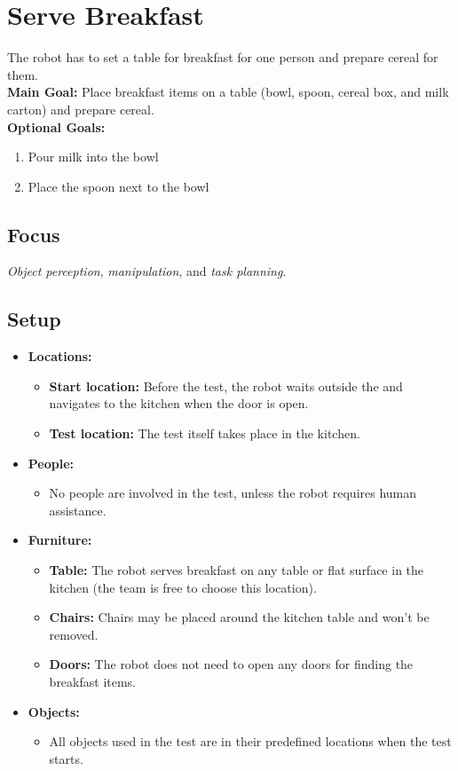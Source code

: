 \section{Serve Breakfast}
\label{test:serve-breakfast}
The robot has to set a table for breakfast for one person and prepare cereal for them.\\

\noindent \textbf{Main Goal:} Place breakfast items on a table (bowl, spoon, cereal box, and milk carton) and prepare cereal.\\

\noindent \textbf{Optional Goals:}
\begin{enumerate}[nosep]
	\item Pour milk into the bowl
	\item Place the spoon next to the bowl
\end{enumerate}

\subsection*{Focus}
\emph{Object perception}, \emph{manipulation}, and \emph{task planning}.

\subsection*{Setup}
\begin{itemize}[nosep]
	\item \textbf{Locations:}
		\begin{itemize}
			\item \textbf{Start location:} Before the test, the robot waits outside the \Arena{} and navigates to the kitchen when the door is open.
			\item \textbf{Test location:} The test itself takes place in the kitchen.
		\end{itemize}
		\item \textbf{People:}
			\begin{itemize}
				\item No people are involved in the test, unless the robot requires human assistance.
			\end{itemize}
	\item \textbf{Furniture:}
		\begin{itemize}
			\item \textbf{Table:} The robot serves breakfast on any table or flat surface in the kitchen (the team is free to choose this location).
			\item \textbf{Chairs:} Chairs may be placed around the kitchen table and won't be removed.
			\item \textbf{Doors:} The robot does not need to open any doors for finding the breakfast items.
		\end{itemize}
	\item \textbf{Objects:}
		\begin{itemize}
			\item All objects used in the test are in their predefined locations when the test starts.
		\end{itemize}
\end{itemize}

